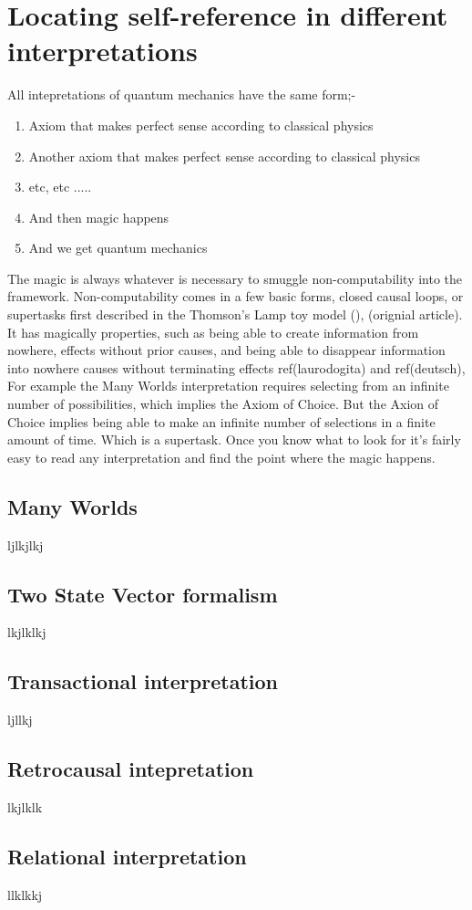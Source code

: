 \documentclass{article}
\begin{document}
\section{Locating self-reference in different interpretations}\label{appendix:interpretatons}
All intepretations of quantum mechanics have the same form;-
\begin{enumerate}
\item Axiom that makes perfect sense according to classical physics
\item Another axiom that makes perfect sense according to classical physics
\item etc, etc .....
\item And then magic happens
\item And we get quantum mechanics
\end{enumerate}
The magic is always whatever is necessary to smuggle non-computability into the framework. Non-computability comes in a few basic forms, closed causal loops, or supertasks first described in the Thomson's Lamp toy model (\autocite{Svozil2009}), (orignial article). It has magically properties, such as being able to create information from nowhere, effects without prior causes, and being able to disappear information into nowhere causes without terminating effects ref(laurodogita) and ref(deutsch), For example the Many Worlds interpretation requires selecting from an infinite number of possibilities, which implies the Axiom of Choice. But the Axion of Choice implies being able to make an infinite number of selections in a finite amount of time. Which is a supertask. Once you know what to look for it's fairly easy to read any interpretation and find the point where the magic happens.
\subsection{Many Worlds}
ljlkjlkj
\subsection{Two State Vector formalism}
lkjlklkj
\subsection{Transactional interpretation}
ljllkj
\subsection{Retrocausal intepretation}
lkjlklk
\subsection{Relational interpretation}
llklkkj
\end{document}
